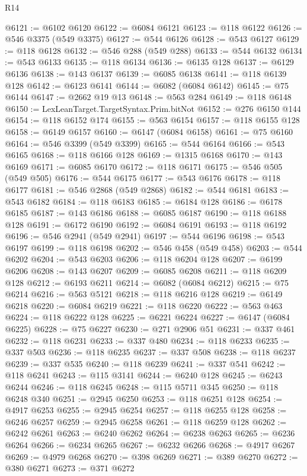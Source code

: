 \begin{lexlean}{R14}
\begin{coremodule}
{{{{{{{{{{{{{{{{{{{{{{{{{{{{{{{{{{{{{{{{{{{{{{{{{{{{{{{{{{{{{{{{{{{{{{{{{{{{{{{{{{@6121 := @6102 @6120
@6122 := @6084 @6121
@6123 := @118 @6122
@6126 := @546 @3375 (@549 @3375)
@6127 := @544 @6126
@6128 := @543 @6127
@6129 := @118 @6128
@6132 := @546 @288 (@549 @288)
@6133 := @544 @6132
@6134 := @543 @6133
@6135 := @118 @6134
@6136 := @6135 @128
@6137 := @6129 @6136
@6138 := @143 @6137
@6139 := @6085 @6138
@6141 := @118 @6139 @128
@6142 := @6123 @6141
@6144 := @6082 (@6084 @6142)
@6145 := @75 @6144
@6147 := @2662 @19 @13
@6148 := @563 @284
@6149 := @118 @6148
@6150 := LexLeanTarget.TargetSyntax.Prim.bitNot
@6152 := @276 @6150 @144
@6154 := @118 @6152 @174
@6155 := @563 @6154
@6157 := @118 @6155 @128
@6158 := @6149 @6157
@6160 := @6147 (@6084 @6158)
@6161 := @75 @6160
@6164 := @546 @3399 (@549 @3399)
@6165 := @544 @6164
@6166 := @543 @6165
@6168 := @118 @6166 @128
@6169 := @1315 @6168
@6170 := @143 @6169
@6171 := @6085 @6170
@6172 := @118 @6171
@6175 := @546 @505 (@549 @505)
@6176 := @544 @6175
@6177 := @543 @6176
@6178 := @118 @6177
@6181 := @546 @2868 (@549 @2868)
@6182 := @544 @6181
@6183 := @543 @6182
@6184 := @118 @6183
@6185 := @6184 @128
@6186 := @6178 @6185
@6187 := @143 @6186
@6188 := @6085 @6187
@6190 := @118 @6188 @128
@6191 := @6172 @6190
@6192 := @6084 @6191
@6193 := @118 @6192
@6196 := @546 @2941 (@549 @2941)
@6197 := @544 @6196
@6198 := @543 @6197
@6199 := @118 @6198
@6202 := @546 @458 (@549 @458)
@6203 := @544 @6202
@6204 := @543 @6203
@6206 := @118 @6204 @128
@6207 := @6199 @6206
@6208 := @143 @6207
@6209 := @6085 @6208
@6211 := @118 @6209 @128
@6212 := @6193 @6211
@6214 := @6082 (@6084 @6212)
@6215 := @75 @6214
@6216 := @563 @5121
@6218 := @118 @6216 @128
@6219 := @6149 @6218
@6220 := @6084 @6219
@6221 := @118 @6220
@6222 := @563 @463
@6224 := @118 @6222 @128
@6225 := @6221 @6224
@6227 := @6147 (@6084 @6225)
@6228 := @75 @6227
@6230 := @271 @2906 @51
@6231 := @337 @461
@6232 := @118 @6231
@6233 := @337 @480
@6234 := @118 @6233
@6235 := @337 @503
@6236 := @118 @6235
@6237 := @337 @508
@6238 := @118 @6237
@6239 := @337 @535
@6240 := @118 @6239
@6241 := @337 @541
@6242 := @118 @6241
@6243 := @115 @3141
@6244 := @6240 @128
@6245 := @6243 @6244
@6246 := @118 @6245
@6248 := @115 @5711 @345
@6250 := @118 @6248 @340
@6251 := @2945 @6250
@6253 := @118 @6251 @128
@6254 := @4917 @6253
@6255 := @2945 @6254
@6257 := @118 @6255 @128
@6258 := @6246 @6257
@6259 := @2945 @6258
@6261 := @118 @6259 @128
@6262 := @6242 @6261
@6263 := @6240 @6262
@6264 := @6238 @6263
@6265 := @6236 @6264
@6266 := @6234 @6265
@6267 := @6232 @6266
@6268 := @4917 @6267
@6269 := @4979 @6268
@6270 := @398 @6269
@6271 := @389 @6270
@6272 := @380 @6271
@6273 := @371 @6272
}}}}}}}}}}}}}}}}}}}}}}}}}}}}}}}}}}}}}}}}}}}}}}}}}}}}}}}}}}}}}}}}}}}}}}}}}}}}}}}}}}
\end{coremodule}
\end{lexlean}

